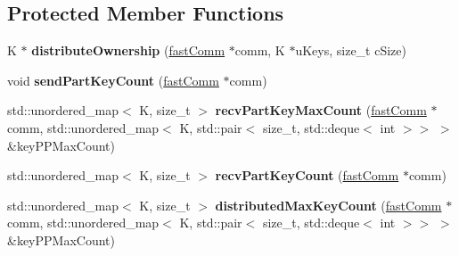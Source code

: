 \subsection*{Protected Member Functions}
\begin{DoxyCompactItemize}
\item 
\hypertarget{classfaster_1_1workerIFddCore_a26fb895202e4047b8e82794719bb0eaa}{}K $\ast$ {\bfseries distribute\+Ownership} (\hyperlink{classfaster_1_1fastComm}{fast\+Comm} $\ast$comm, K $\ast$u\+Keys, size\+\_\+t c\+Size)\label{classfaster_1_1workerIFddCore_a26fb895202e4047b8e82794719bb0eaa}

\item 
\hypertarget{classfaster_1_1workerIFddCore_a160215ff486742aa4795e90e71cd8f0e}{}void {\bfseries send\+Part\+Key\+Count} (\hyperlink{classfaster_1_1fastComm}{fast\+Comm} $\ast$comm)\label{classfaster_1_1workerIFddCore_a160215ff486742aa4795e90e71cd8f0e}

\item 
\hypertarget{classfaster_1_1workerIFddCore_af5fdb0b95a8029bbe6b588fb7be45c07}{}std\+::unordered\+\_\+map$<$ K, size\+\_\+t $>$ {\bfseries recv\+Part\+Key\+Max\+Count} (\hyperlink{classfaster_1_1fastComm}{fast\+Comm} $\ast$comm, std\+::unordered\+\_\+map$<$ K, std\+::pair$<$ size\+\_\+t, std\+::deque$<$ int $>$$>$ $>$ \&key\+P\+P\+Max\+Count)\label{classfaster_1_1workerIFddCore_af5fdb0b95a8029bbe6b588fb7be45c07}

\item 
\hypertarget{classfaster_1_1workerIFddCore_a5b87c56a369a077ad1b194359f8a73bc}{}std\+::unordered\+\_\+map$<$ K, size\+\_\+t $>$ {\bfseries recv\+Part\+Key\+Count} (\hyperlink{classfaster_1_1fastComm}{fast\+Comm} $\ast$comm)\label{classfaster_1_1workerIFddCore_a5b87c56a369a077ad1b194359f8a73bc}

\item 
\hypertarget{classfaster_1_1workerIFddCore_ac15047cf51618a15489993fe3a263837}{}std\+::unordered\+\_\+map$<$ K, size\+\_\+t $>$ {\bfseries distributed\+Max\+Key\+Count} (\hyperlink{classfaster_1_1fastComm}{fast\+Comm} $\ast$comm, std\+::unordered\+\_\+map$<$ K, std\+::pair$<$ size\+\_\+t, std\+::deque$<$ int $>$$>$ $>$ \&key\+P\+P\+Max\+Count)\label{classfaster_1_1workerIFddCore_ac15047cf51618a15489993fe3a263837}

\end{DoxyCompactItemize}
